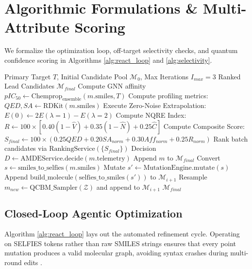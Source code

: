 \documentclass[journal,10pt,twocolumn]{IEEEtran}
\begin{document}
\section{Algorithmic Formulations \& Multi-Attribute Scoring}
We formalize the optimization loop, off-target selectivity checks, and quantum confidence scoring in Algorithms \ref{alg:react_loop} and \ref{alg:selectivity}.
\begin{algorithm}[!t]
\caption{Closed-Loop Autonomous Candidate Optimization Loop}
\label{alg:react_loop}
\small
\begin{algorithmic}[1]
\REQUIRE Primary Target $T$, Initial Candidate Pool $\mathcal{M}_0$, Max Iterations $I_{max} = 3$
\ENSURE Ranked Lead Candidates $\mathcal{M}_{final}$
        \STATE Compute GNN affinity $pIC_{50} \leftarrow \text{Chemprop}_{\text{ensemble}}(m.\text{smiles}, T)$
        \STATE Compute profiling metrics: $QED, SA \leftarrow \text{RDKit}(m.\text{smiles})$
        \STATE Execute Zero-Noise Extrapolation: $E(0) \leftarrow 2 E(\lambda=1) - E(\lambda=2)$
        \STATE Compute NQRE Index: $R \leftarrow 100 \times [0.40(1-\hat{V}) + 0.35(1-\hat{N}) + 0.25\hat{C}]$
        \STATE Compute Composite Score: $S_{final} \leftarrow 100 \times (0.25 QED + 0.20 SA_{norm} + 0.30 Aff_{norm} + 0.25 R_{norm})$
    \ENDFOR
    \STATE Rank batch candidates via $\text{RankingService}(\{S_{final}\})$
        \STATE Decision $D \leftarrow \text{AMDEService.decide}(m.\text{telemetry})$
            \STATE Append $m$ to $\mathcal{M}_{final}$
            \STATE Convert $s \leftarrow \text{smiles\_to\_selfies}(m.\text{smiles})$
            \STATE Mutate $s' \leftarrow \text{MutationEngine.mutate}(s)$ 
            \STATE Append $\text{build\_molecule}(\text{selfies\_to\_smiles}(s'))$ to $\mathcal{M}_{i+1}$
            \STATE Resample $m_{new} \leftarrow \text{QCBM\_Sampler}(\mathcal{Z})$ and append to $\mathcal{M}_{i+1}$
        \ENDIF
    \ENDFOR
\ENDFOR
\RETURN $\mathcal{M}_{final}$
\end{algorithmic}
\end{algorithm}

\subsection{Closed-Loop Agentic Optimization}
Algorithm \ref{alg:react_loop} lays out the automated refinement cycle. Operating on SELFIES tokens rather than raw SMILES strings ensures that every point mutation produces a valid molecular graph, avoiding syntax crashes during multi-round edits \cite{krenn2020selfies}.
\end{document}
